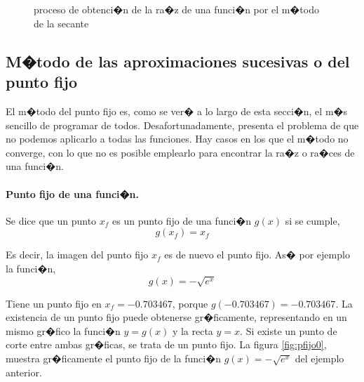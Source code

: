 \begin{figure}
\centering
{} \qquad
{}\\
\qquad
{}\\
\qquad
{}

\caption{proceso de obtenci�n de la ra�z de una funci�n por el m�todo de la secante}
\label{fig:secante3}
\end{figure}

\subsection{M�todo de las aproximaciones sucesivas o del punto fijo}

El m�todo del punto fijo es, como se ver� a lo largo de esta secci�n, el m�s sencillo de programar de todos. Desafortunadamente, presenta el problema de que no podemos aplicarlo a todas las funciones. Hay casos en los que el m�todo no converge, con lo que no es posible emplearlo para encontrar la ra�z o ra�ces de una funci�n.
 
\paragraph{Punto fijo de una funci�n.} Se dice que un punto $x_f$ es un punto fijo de una funci�n $g(x)$ si se cumple,
\begin{equation*}
g(x_f)=x_f
\end{equation*}

Es decir, la imagen del punto fijo $x_f$ es de nuevo el punto fijo. As� por ejemplo la funci�n,
\begin{equation*}
g(x)=-\sqrt{e^x}
\end{equation*}

Tiene un punto fijo en $x_f=-0.703467$, porque $g(-0.703467)=-0.703467$. La existencia de un punto fijo puede obtenerse gr�ficamente, representando en un mismo gr�fico la funci�n $y=g(x)$ y la recta $y=x$. Si existe un punto de corte entre ambas gr�ficas, se trata de un punto fijo.  La figura \ref{fig:pfijo0}, muestra gr�ficamente el punto fijo de la funci�n $g(x)=-\sqrt{e^x}$ del ejemplo anterior.

